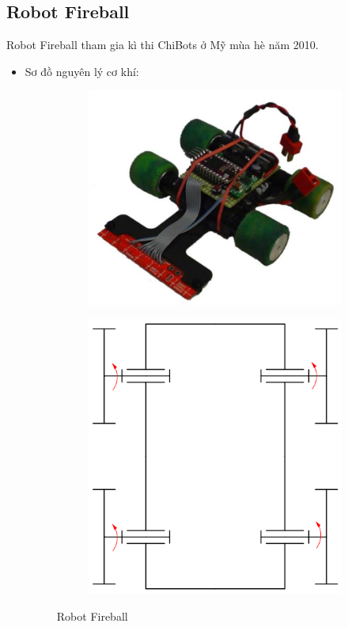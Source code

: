     \subsection{Robot Fireball}
        \hspace*{0.6cm}Robot Fireball tham gia kì thi ChiBots ở Mỹ mùa hè năm 2010.
        \begin{itemize}
            \item Sơ đồ nguyên lý cơ khí:
            \begin{figure}[H]
                \begin{subfigure}{0.5\textwidth}
                \centering
                \includegraphics[width=0.6\linewidth, right]{pictures/chapter1/chapter1_pic13a_fireball.png} 
                \label{chap1_pic13a}
                \end{subfigure}
                \begin{subfigure}{0.6\textwidth}
                \includegraphics[width=0.5\linewidth]{pictures/chapter1/chapter1_pic13b_fireball.png}
                \label{chap1_pic13b}
                \end{subfigure}
                \caption{Robot Fireball}
                \label{chap1_pic13}
            \end{figure}

\end{itemize}
